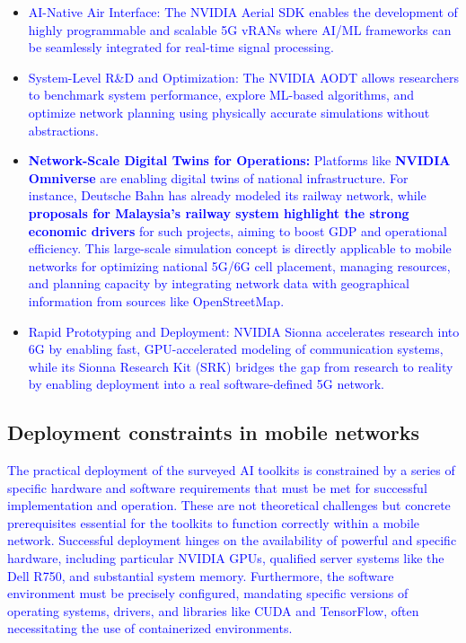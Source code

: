 \documentclass[conference]{IEEEtran}
\begin{document}
\begin{itemize}
    \item \textcolor{blue}{AI-Native Air Interface: The NVIDIA Aerial SDK enables the development of highly programmable and scalable 5G vRANs where AI/ML frameworks can be seamlessly integrated for real-time signal processing.}

    \item \textcolor{blue}{System-Level R\&D and Optimization: The NVIDIA AODT allows researchers to benchmark system performance, explore ML-based algorithms, and optimize network planning using physically accurate simulations without abstractions.}

    \item \textcolor{blue}{\textbf{Network-Scale Digital Twins for Operations:} Platforms like \textbf{NVIDIA Omniverse} are enabling digital twins of national infrastructure. For instance, Deutsche Bahn has already modeled its railway network, while \textbf{proposals for Malaysia's railway system highlight the strong economic drivers} for such projects, aiming to boost GDP and operational efficiency. This large-scale simulation concept is directly applicable to mobile networks for optimizing national 5G/6G cell placement, managing resources, and planning capacity by integrating network data with geographical information from sources like OpenStreetMap.}

    \item \textcolor{blue}{Rapid Prototyping and Deployment: NVIDIA Sionna accelerates research into 6G by enabling fast, GPU-accelerated modeling of communication systems, while its Sionna Research Kit (SRK) bridges the gap from research to reality by enabling deployment into a real software-defined 5G network.}
\end{itemize}

\subsection{Deployment constraints in mobile networks}

\textcolor{blue}{The practical deployment of the surveyed AI toolkits is constrained by a series of specific hardware and software requirements that must be met for successful implementation and operation. These are not theoretical challenges but concrete prerequisites essential for the toolkits to function correctly within a mobile network. Successful deployment hinges on the availability of powerful and specific hardware, including particular NVIDIA GPUs, qualified server systems like the Dell R750, and substantial system memory. Furthermore, the software environment must be precisely configured, mandating specific versions of operating systems, drivers, and libraries like CUDA and TensorFlow, often necessitating the use of containerized environments.}
\end{document}
